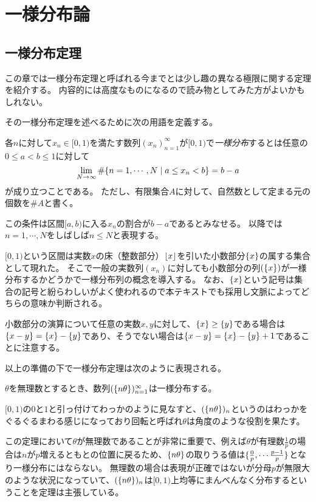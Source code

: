
\chapter{一様分布論}

\section{一様分布定理}

この章では一様分布定理と呼ばれる今までとは少し趣の異なる極限に関する定理を紹介する。
内容的には高度なものになるので読み物としてみた方がよいかもしれない。

その一様分布定理を述べるために次の用語を定義する。

\begin{definition}[一様分布列]
各$n$に対して$x_n \in [0, 1)$を満たす数列$(x_n)_{n = 1}^\infty$が$[0, 1)$で\emph{一様分布}するとは任意の$0 \le a < b \le 1$に対して
$$
\lim_{N \to \infty}\#\{ n = 1, \cdots, N \mid a \le x_n < b \} = b-a
$$
が成り立つことである。
ただし、有限集合$A$に対して、自然数として定まる元の個数を$\# A$と書く。
\end{definition}

この条件は区間$[a, b)$に入る$x_n$の割合が$b-a$であるとみなせる。
以降では$n = 1, \cdots, N$をしばしば$n \le N$と表現する。

$[0, 1)$という区間は実数$x$の床（整数部分）$\lfloor x\rfloor$を引いた小数部分$\{x\}$の属する集合として現れた。
そこで一般の実数列$(x_n)$に対しても小数部分の列$(\{x\})$が一様分布するかどうかで一様分布列の概念を導入する。
なお、$\{x\}$という記号は集合の記号と紛らわしいがよく使われるので本テキストでも採用し文脈によってどちらの意味か判断される。

\begin{remark}
小数部分の演算について任意の実数$x, y$に対して、$\{x\} \ge \{y\}$である場合は$\{x-y\} = \{x\}-\{y\}$であり、そうでない場合は$\{x-y\} = \{x\}-\{y\}+1$であることに注意する。
\end{remark}

以上の準備の下で一様分布定理は次のように表現される。

\begin{theorem}[一様分布定理]
$\theta$を無理数とするとき、数列$(\{n\theta\})_{n = 1}^\infty$は一様分布する。
\end{theorem}

$[0, 1)$の$0$と$1$と引っ付けてわっかのように見なすと、$(\{n\theta\})_n$というのはわっかをぐるぐるまわる感じになっており回転と呼ばれ$\theta$は角度のような役割を果たす。

この定理において$\theta$が無理数であることが非常に重要で、例えば$\theta$が有理数$\frac{1}{p}$の場合は$n$が$p$増えるともとの位置に戻るため、$\{n\theta\}$の取りうる値は$\{ \frac{0}{p}, \cdots \frac{p-1}{p} \}$となり一様分布にはならない。
無理数の場合は表現が正確ではないが分母$p$が無限大のような状況になっていて、$(\{n\theta\})_n$は$[0, 1)$上均等にまんべんなく分布するということを定理は主張している。
